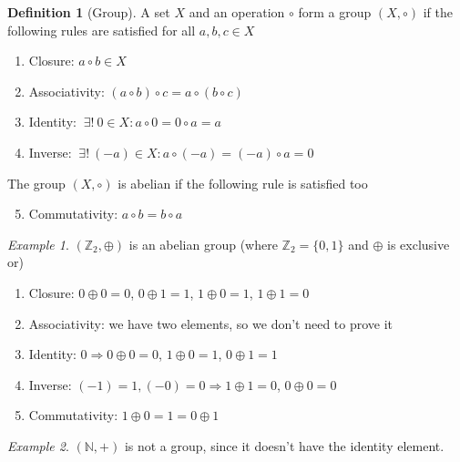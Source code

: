 \documentclass{article}
\newcommand{\Ar}{\Rightarrow}
\newenvironment{enumrom}{\begin{enumerate}[label=(\roman*)]}{\end{enumerate}}
\theoremstyle{definition}
\newtheorem{definition}{Definition}[section]
\theoremstyle{definition}
\theoremstyle{plain}
\theoremstyle{plain}
\theoremstyle{plain}
\theoremstyle{plain}
\theoremstyle{definition}
\theoremstyle{remark}
\newtheorem{exampled}{Example}[definition]
\theoremstyle{remark}
\theoremstyle{remark}
\theoremstyle{remark}
\newcommand{\N}{\mathbb{N}}
\newcommand{\Z}{\mathbb{Z}}
\newcommand{\ExistsI}{\ \exists! \ }
\begin{document}
\begin{definition}[Group]
  A set $X$ and an operation $\circ$ form a group $(X, \circ)$ if the following rules are satisfied for all $a, b, c \in X$
  \begin{enumrom}
  \item Closure: $a \circ b \in X$
  \item Associativity: $(a \circ b) \circ c = a \circ (b \circ c)$
  \item Identity: $\ExistsI 0 \in X : a \circ 0 = 0 \circ a = a$
  \item Inverse: $\ExistsI (-a) \in X : a \circ (-a) = (-a) \circ a = 0$
  \end{enumrom}
  The group $(X, \circ)$ is abelian if the following rule is satisfied too
  \begin{enumrom}
    \setcounter{enumi}{4}
  \item Commutativity: $a \circ b = b \circ a$
  \end{enumrom}
\end{definition}

\begin{exampled}
  $(\Z_2, \oplus)$ is an abelian group (where $\Z_2 = \{ 0, 1 \}$ and $\oplus$ is exclusive or)
  \begin{enumrom}
  \item Closure: $0 \oplus 0 = 0$, $0 \oplus 1 = 1$, $1 \oplus 0 = 1$, $1 \oplus 1 = 0$
  \item Associativity: we have two elements, so we don't need to prove it
  \item Identity: $0 \Ar 0 \oplus 0 = 0$, $1 \oplus 0 = 1$, $0 \oplus 1 = 1$
  \item Inverse: $(-1) = 1, (-0) = 0 \Ar 1 \oplus 1 = 0$, $0 \oplus 0 = 0$
  \item Commutativity: $1 \oplus 0 = 1 = 0 \oplus 1$
  \end{enumrom}
\end{exampled}

\begin{exampled}
  $(\N, +)$ is not a group, since it doesn't have the identity element.
\end{exampled}
\end{document}
